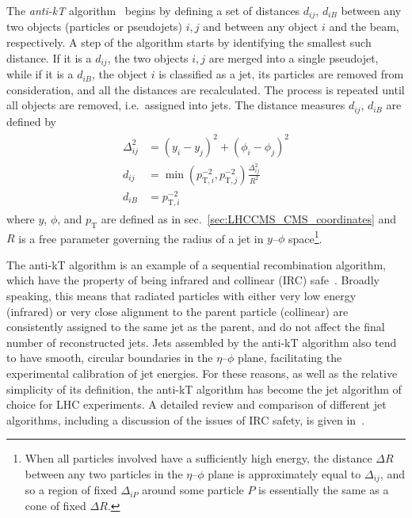 The \textit{anti-kT} algorithm~\cite{ref:1126-6708/2008/04/063} begins by defining a set of distances $d_{ij}$, $d_{iB}$ between any two objects (particles or pseudojets) $i,j$
and between any object $i$ and the beam, respectively. A step of the algorithm starts by identifying the smallest such distance. If it is a $d_{ij}$, the two objects
$i,j$ are merged into a single pseudojet, while if it is a $d_{iB}$, the object $i$ is classified as a jet, its particles are removed from consideration, and all the
distances are recalculated. The process is repeated until all objects are removed, i.e.\ assigned into jets. The distance measures $d_{ij}$, $d_{iB}$ are defined by
\begin{equation}
\begin{gathered}
\begin{aligned}
\Delta_{ij}^{2} &= (y_{i} - y_{j})^{2} + (\phi_{i} - \phi_{j})^{2}\\
d_{ij} &= \min(p_{\mathrm{T},i}^{-2}, p_{\mathrm{T},j}^{-2})\frac{\Delta_{ij}^{2}}{R^{2}}\\
d_{iB} &= p_{\mathrm{T},i}^{-2}
\end{aligned}
\end{gathered}
\label{eq:jet_distance}
\end{equation}
where $y$, $\phi$, and $p_{\mathrm{T}}$ are defined as in sec.~\ref{sec:LHCCMS_CMS_coordinates} and $R$ is a free parameter governing the radius of a jet
in $y$--$\phi$ space\footnote{When all particles involved have a sufficiently high energy, the distance $\Delta R$ between any two particles in the $\eta$--$\phi$ plane
is approximately equal to $\Delta_{ij}$, and so a region of fixed $\Delta_{iP}$ around some particle $P$ is essentially the same as a cone of fixed $\Delta R$.}.

The anti-kT algorithm is an example of a sequential recombination algorithm, which have the property of being infrared and collinear (IRC) safe~\cite{ref:epjc/s10052-010-1314-6}.
Broadly speaking, this means that radiated particles with either very low energy (infrared) or very close alignment to the parent particle (collinear) are
consistently assigned to the same jet as the parent, and do not affect the final number of reconstructed jets. Jets assembled by the anti-kT algorithm
also tend to have smooth, circular boundaries in the $\eta$--$\phi$ plane, facilitating the experimental calibration of jet energies.
For these reasons, as well as the relative simplicity of its definition, the anti-kT algorithm has become the jet algorithm of choice for LHC experiments.
A detailed review and comparison of different jet algorithms, including a discussion of the issues of IRC safety, is given in~\cite{ref:epjc/s10052-010-1314-6}.

